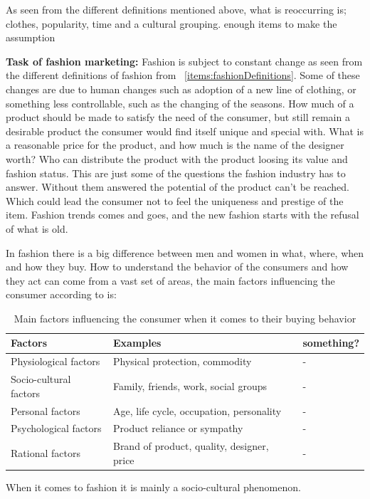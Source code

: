 As seen from the different definitions mentioned above, what is reoccurring is;
clothes, popularity, time and a cultural grouping.
enough items to make the assumption

\textbf{Task of fashion marketing:}
Fashion is subject to constant change as seen from the different definitions of fashion from ~\ref{items:fashionDefinitions}.
Some of these changes are due to human changes such as adoption of a new line of clothing, or something less controllable, such as the changing of the seasons.
How much of a product should be made to satisfy the need of the consumer, but still remain a desirable product the consumer would find itself unique and special with.
What is a reasonable price for the product, and how much is the name of the designer worth?
Who can distribute the product with the product loosing its value and fashion status.
This are just some of the questions the fashion industry has to answer.
Without them answered the potential of the product can't be reached.
Which could lead the consumer not to feel the uniqueness and prestige of the item.
Fashion trends comes and goes, and the new fashion starts with the refusal of what is old.


In fashion there is a big difference between men and women in what, where, when
and how they buy.  How to understand the behavior of the consumers and how they
act can come from a vast set of areas, the main factors influencing the consumer according to \cite{kotler2009marketing} is:

\begin{table}[H]
    \centering
    \begin{tabular}{l|l|l}
      \textbf{Factors}        & \textbf{Examples} & \textbf{something?} \\ \hline
      Physiological factors   & Physical protection, commodity & - \\ \hline
      Socio-cultural factors  & Family, friends, work, social groups & - \\ \hline
      Personal factors        & Age, life cycle, occupation, personality & - \\ \hline
      Psychological factors   & Product reliance or sympathy & - \\ \hline %
      Rational factors        & Brand of product, quality, designer, price & - \\
    \end{tabular}
    \label{table:FashionFactors}
    \caption [Fashion Factors]{Main factors influencing the consumer when it comes to their buying behavior}
\end{table}
When it comes to fashion it is mainly a socio-cultural phenomenon.

